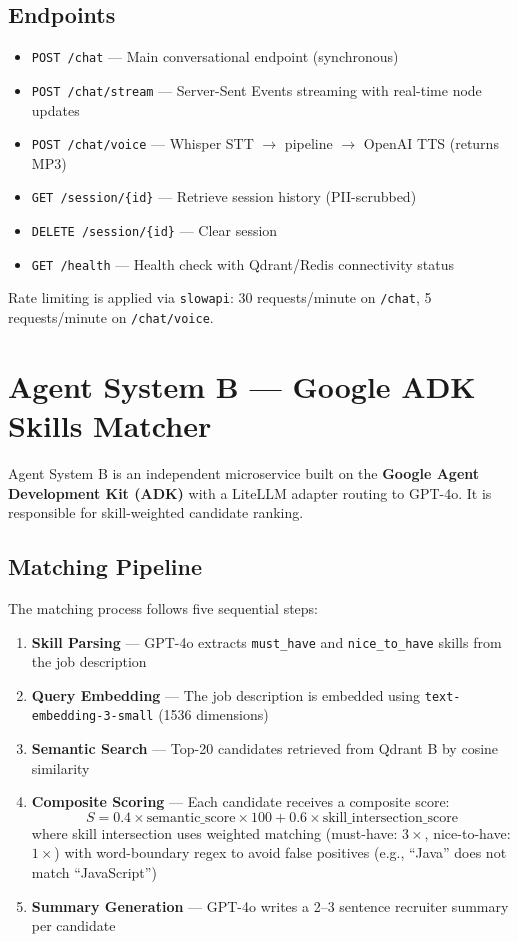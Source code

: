 \documentclass[12pt, a4paper]{article}
\begin{document}
\subsection{Endpoints}

\begin{itemize}[leftmargin=1.5em]
    \item \texttt{POST /chat} — Main conversational endpoint (synchronous)
    \item \texttt{POST /chat/stream} — Server-Sent Events streaming with real-time node updates
    \item \texttt{POST /chat/voice} — Whisper STT $\to$ pipeline $\to$ OpenAI TTS (returns MP3)
    \item \texttt{GET /session/\{id\}} — Retrieve session history (PII-scrubbed)
    \item \texttt{DELETE /session/\{id\}} — Clear session
    \item \texttt{GET /health} — Health check with Qdrant/Redis connectivity status
\end{itemize}

Rate limiting is applied via \texttt{slowapi}: 30 requests/minute on \texttt{/chat}, 5 requests/minute on \texttt{/chat/voice}.

\section{Agent System B — Google ADK Skills Matcher}

Agent System B is an independent microservice built on the \textbf{Google Agent Development Kit (ADK)} with a LiteLLM adapter routing to GPT-4o. It is responsible for skill-weighted candidate ranking.

\subsection{Matching Pipeline}

The matching process follows five sequential steps:

\begin{enumerate}[leftmargin=1.5em]
    \item \textbf{Skill Parsing} — GPT-4o extracts \texttt{must\_have} and \texttt{nice\_to\_have} skills from the job description
    \item \textbf{Query Embedding} — The job description is embedded using \texttt{text-embedding-3-small} (1536 dimensions)
    \item \textbf{Semantic Search} — Top-20 candidates retrieved from Qdrant B by cosine similarity
    \item \textbf{Composite Scoring} — Each candidate receives a composite score:
    \[
    S = 0.4 \times \text{semantic\_score} \times 100 + 0.6 \times \text{skill\_intersection\_score}
    \]
    where skill intersection uses weighted matching (must-have: $3\times$, nice-to-have: $1\times$) with word-boundary regex to avoid false positives (e.g., ``Java'' does not match ``JavaScript'')
    \item \textbf{Summary Generation} — GPT-4o writes a 2--3 sentence recruiter summary per candidate
\end{enumerate}
\end{document}
